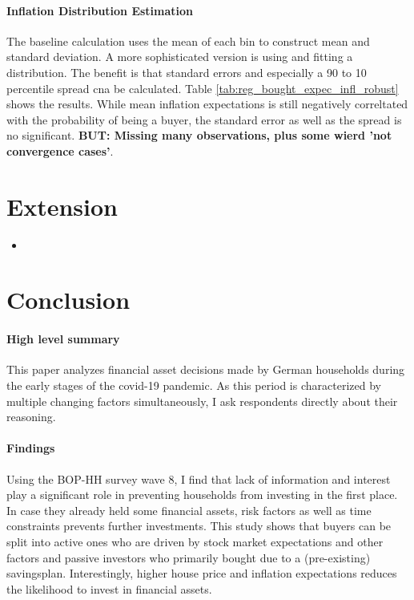 \documentclass[ProjectABM]{subfiles}
\begin{document}
\paragraph{Inflation Distribution Estimation}
The baseline calculation uses the mean of each bin to construct mean and standard deviation. A more sophisticated version is using \cite{engelberg_manski_2009distribution} and fitting a distribution. The benefit is that standard errors and especially a 90 to 10 percentile spread cna be calculated. Table \ref{tab:reg_bought_expec_infl_robust} shows the results. While mean inflation expectations is still negatively correltated with the probability of being a buyer, the standard error as well as the spread is no significant. \textbf{BUT: Missing many observations, plus some wierd 'not convergence cases'}.

\section{Extension}
\begin{itemize}
	\item 
\end{itemize}

\section{Conclusion}\label{sec:conclusion}
\paragraph{High level summary}
This paper analyzes financial asset decisions made by German households during the early stages of the covid-19 pandemic. As this period is characterized by multiple changing factors simultaneously, I ask respondents directly about their reasoning. 

\paragraph{Findings}
Using the BOP-HH survey wave 8, I find that lack of information and interest play a significant role in preventing households from investing in the first place. In case they already held some financial assets, risk factors as well as time constraints prevents further investments. This study shows that buyers can be split into active ones who are driven by stock market expectations and other factors and passive investors who primarily bought due to a (pre-existing) savingsplan. Interestingly, higher house price and inflation expectations reduces the likelihood to invest in financial assets.
\end{document}
